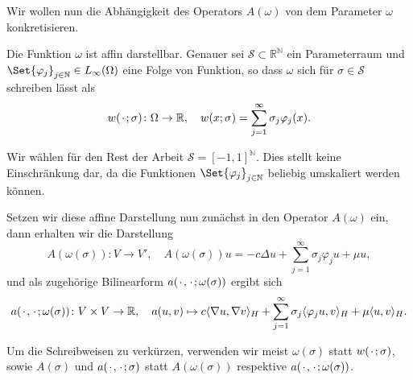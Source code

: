 Wir wollen nun die Abhängigkeit des Operators $A(\omega)$ von dem Parameter $\omega$ konkretisieren.

\begin{Definition}
\label{definition:pp:omega_affin}
    Die Funktion $\omega$ ist affin darstellbar.
    Genauer sei $\mathcal S \subset \mathbb{R}^{\mathbb{N}}$ ein Parameterraum und $\Set{ \varphi_{j} }_{j \in \mathbb{N}} \in L_{\infty}(\Omega)$ eine Folge von Funktion, so dass $\omega$ sich für $\sigma \in \mathcal S$ schreiben lässt als
    \begin{equation}
        w({\mkern2mu\cdot\mkern2mu}; \sigma) \colon \Omega \to \mathbb{R}, \quad w(x; \sigma) = \sum_{j = 1}^{\infty} \sigma_{j} \varphi_{j}(x).
    \end{equation}
\end{Definition}

\begin{Bemerkung}
    Wir wählen für den Rest der Arbeit $\mathcal S = [-1, 1]^{\mathbb{N}}$.
    Dies stellt keine Einschränkung dar, da die Funktionen $\Set{ \varphi_{j} }_{j \in \mathbb{N}}$ beliebig umskaliert werden können.
\end{Bemerkung}

Setzen wir diese affine Darstellung nun zunächst in den Operator $A(\omega)$ ein, dann erhalten wir die Darstellung
\begin{equation}
    A(\omega(\sigma)) \colon V \to V', \quad A(\omega(\sigma)) u = -c \Delta u + \sum_{j = 1}^{\infty} \sigma_{j} \varphi_{j} u + \mu u,
\end{equation}
und als zugehörige Bilinearform $a({\mkern2mu\cdot\mkern2mu}, {\mkern2mu\cdot\mkern2mu}; \omega(\sigma))$ ergibt sich
\begin{equation}
\label{eq:pp:bf_a_sigma}
    a({\mkern2mu\cdot\mkern2mu}, {\mkern2mu\cdot\mkern2mu}; \omega(\sigma)) \colon V \times V \to \mathbb{R}, \quad a(u, v) \mapsto c\langle\nabla u,\nabla v\rangle_{H} + \sum_{j = 1}^{\infty} \sigma_{j} \langle\varphi_{j} u,v\rangle_{H} + \mu \langle u,v\rangle_{H}.
\end{equation}

\begin{Bemerkung}
    Um die Schreibweisen zu verkürzen, verwenden wir meist $\omega(\sigma)$ statt $w({\mkern2mu\cdot\mkern2mu}; \sigma)$, sowie $A(\sigma)$ und $a({\mkern2mu\cdot\mkern2mu}, {\mkern2mu\cdot\mkern2mu}; \sigma)$ statt $A(\omega(\sigma))$ respektive $a({\mkern2mu\cdot\mkern2mu}, {\mkern2mu\cdot\mkern2mu}; \omega(\sigma))$.
\end{Bemerkung}

